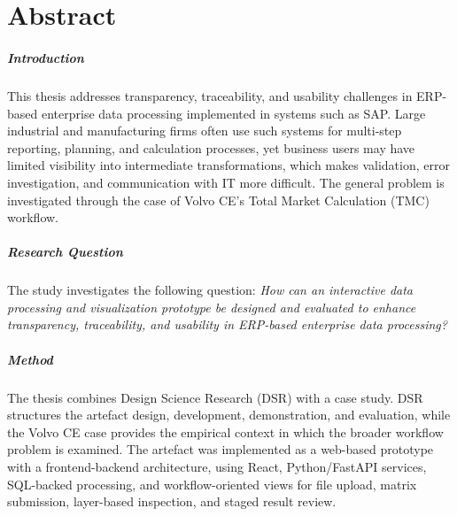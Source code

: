 

\chapter*{Abstract}
\pagestyle{plain}

\paragraph{Introduction} This thesis addresses transparency, traceability, and usability challenges in ERP-based enterprise data processing implemented in systems such as SAP. Large industrial and manufacturing firms often use such systems for multi-step reporting, planning, and calculation processes, yet business users may have limited visibility into intermediate transformations, which makes validation, error investigation, and communication with IT more difficult. The general problem is investigated through the case of Volvo CE's Total Market Calculation (TMC) workflow.

\paragraph{Research Question} The study investigates the following question: \textit{How can an interactive data processing and visualization prototype be designed and evaluated to enhance transparency, traceability, and usability in ERP-based enterprise data processing?}

\paragraph{Method} The thesis combines Design Science Research (DSR) with a case study. DSR structures the artefact design, development, demonstration, and evaluation, while the Volvo CE case provides the empirical context in which the broader workflow problem is examined. The artefact was implemented as a web-based prototype with a frontend-backend architecture, using React, Python/FastAPI services, SQL-backed processing, and workflow-oriented views for file upload, matrix submission, layer-based inspection, and staged result review.

